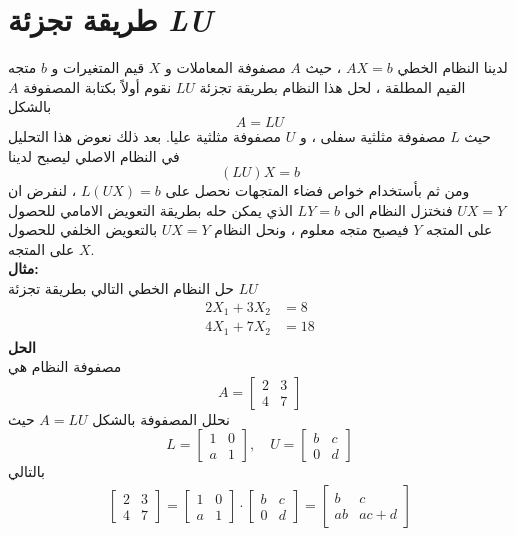 \section{طريقة تجزئة \textit{LU}}
لدينا النظام الخطي $AX=b$ ، حيث $A$ مصفوفة المعاملات و $X$ قيم المتغيرات و $b$ متجه القيم المطلقة ، لحل هذا النظام بطريقة تجزئة $LU$  نقوم أولاً بكتابة المصفوفة $A$ بالشكل 
\begin{equation*}
	A = LU
\end{equation*}
حيث $L$ مصفوفة مثلثية سفلى ، و $U$ مصفوفة مثلثية عليا. بعد ذلك نعوض هذا التحليل في النظام الاصلي ليصبح لدينا 
\[
(LU)X = b
\]
ومن ثم بأستخدام خواص فضاء المتجهات نحصل على $L(UX) = b$ ، لنفرض ان $UX = Y$ فنختزل النظام الى $L Y = b$ الذي يمكن حله بطريقة التعويض الامامي للحصول على المتجه $Y$ فيصبح متجه معلوم ، ونحل النظام $UX = Y$ بالتعويض الخلفي للحصول على المتجه $X$.\\
\noindent
\textbf{مثال:}\\
\noindent
حل النظام الخطي التالي بطريقة تجزئة $LU$
\begin{align*}
	2X_1+ 3X_2 &= 8\\
	4X_1 + 7X_2 &= 18
\end{align*}
\noindent
\textbf{الحل}\\
\noindent
مصفوفة النظام هي 
\[
A = 
\begin{bmatrix}
	2&3\\
	4&7
\end{bmatrix}
\]
نحلل المصفوفة بالشكل $A = LU$ حيث
\[
L = 
\begin{bmatrix}
	1 & 0\\
	a & 1
\end{bmatrix},\quad
U = 
\begin{bmatrix}
	b & c\\
	0 & d
\end{bmatrix}
\]
\newpage\noindent
بالتالي
\begin{align*}
	\begin{bmatrix}
		2&3\\
		4&7
	\end{bmatrix} =
	\begin{bmatrix}
		1 & 0\\
		a & 1
	\end{bmatrix}\cdot
	\begin{bmatrix}
		b & c\\
		0 & d
	\end{bmatrix}
	= 
	\begin{bmatrix}
		b & c\\
		ab & ac + d
	\end{bmatrix}
\end{align*}
